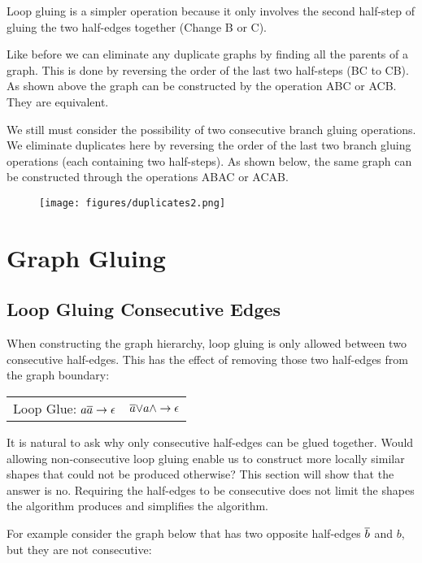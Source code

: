 \documentclass[acmtog]{acmart}
\begin{document}
Loop gluing is a simpler operation because it only involves the second half-step
of gluing the two half-edges together (Change B or C).

Like before we can eliminate any duplicate graphs by finding all the parents 
of a graph. This is done by reversing the order of the last two half-steps
(BC to CB). As shown above the graph can be constructed by the operation ABC 
or ACB. They are equivalent.

We still must consider the possibility of two consecutive branch gluing
operations. We eliminate duplicates here by reversing the order of the last two
branch gluing operations (each containing two half-steps). As shown below, the
same graph can be constructed through the operations ABAC or ACAB.

\begin{figure}[H]
\centering
\texttt{[image: figures/duplicates2.png]}
\end{figure}

\section{Graph Gluing}

\subsection{Loop Gluing Consecutive Edges}

When constructing the graph hierarchy, loop gluing is only allowed between two
consecutive half-edges. This has the effect of removing those two half-edges
from the graph boundary:

\begin{center}
\begin{tabular}{c @{\hskip 1cm} c}
Loop Glue: $a\overline{a} \rightarrow \epsilon$ & $\overline{a} {\vee} a{\wedge} \rightarrow \epsilon $ \\
\end{tabular}
\end{center}

It is natural to ask why only consecutive half-edges can be glued together. 
Would allowing non-consecutive loop gluing enable us to construct more locally 
similar shapes that could not be produced otherwise? This section will show 
that the answer is no. Requiring the half-edges to be consecutive does not 
limit the shapes the algorithm produces and simplifies the algorithm.

For example consider the graph below that has two opposite half-edges $\overline{b}$
and $b$, but they are not consecutive:
\end{document}
